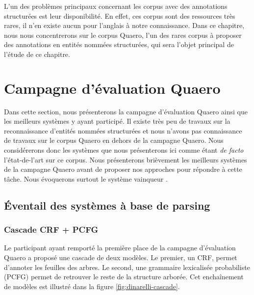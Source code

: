 \documentclass[12pt,a4paper,times,twoside,openright]{report}
\begin{document}
L'un des problèmes principaux concernant les corpus avec des annotations structurées est leur disponibilité. En effet, ces corpus sont des ressources très rares, il n'en existe aucun pour l'anglais à notre connaissance. Dans ce chapitre, nous nous concentrerons sur le corpus Quaero, l'un des rares corpus à proposer des annotations en entités nommées structurées, qui sera l'objet principal de l'étude de ce chapitre.


    
    \section{Campagne d'évaluation Quaero}
    \label{sec:quaero-campaign}
Dans cette section, nous présenterons la campagne d'évaluation Quaero \citep{galibert2011structured} ainsi que les meilleurs systèmes y ayant participé. Il existe très peu de travaux sur la reconnaissance d'entités nommées structurées et nous n'avons pas connaissance de travaux sur le corpus Quaero en dehors de la campagne Quaero. Nous considérerons donc les systèmes que nous présenterons ici comme étant \emph{de facto} l'état-de-l'art sur ce corpus. Nous présenterons brièvement les meilleurs systèmes de la campagne Quaero avant de proposer nos approches pour répondre à cette tâche. Nous évoquerons surtout le système vainqueur \citet{dinarelli2012}.


    
        \subsection{Éventail des systèmes à base de parsing}
        \label{subsec:structured-ner-parsing-based}
        
            \subsubsection{Cascade CRF + PCFG}
            \label{subsubsec:cascade-marco}
Le participant ayant remporté la première place \citep{dinarelli2012} de la campagne d'évaluation Quaero \citep{galibert2011structured} a proposé une cascade de deux modèles. Le premier, un CRF, permet d'annoter les feuilles des arbres. Le second, une grammaire lexicalisée probabiliste (PCFG) permet de retrouver le reste de la structure arborée. Cet enchaînement de modèles est illustré dans la figure \ref{fig:dinarelli-cascade}.
\end{document}
